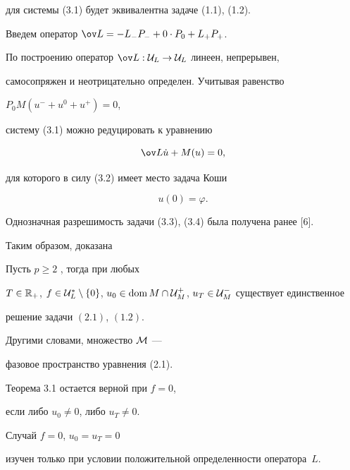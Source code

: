 для системы (3.1) будет эквивалентна задаче (1.1), (1.2).





Введем оператор $\ov L = -L_- P_- + 0\cdot P_0 + L_+ P_+$.


По построению оператор $\ov L : {\cal U}_L\to{\cal U}_L$ линеен, непрерывен,


самосопряжен и неотрицательно определен. Учитывая равенство


$P_0 M (u^- + u^0 + u^+) = 0$,


систему (3.1) можно редуцировать к уравнению


\begin{equation}


\ov L \dot u + M(u) = 0,


\end{equation}


для которого в силу (3.2) имеет место задача Коши


\begin{equation}


u(0) = \varphi.


\end{equation}


Однозначная разрешимость задачи (3.3), (3.4) была получена ранее [6].


Таким образом, доказана





\begin{thms}


Пусть $p\ge 2$ , тогда при любых


$T\in{\Bbb R}_+$, $f\in {\cal U}^*_L\setminus\{0\}$, $u_0\in\doms


M\cap {\cal U}^+_M$, $u_T\in{\cal U}^-_M$ существует единственное


решение задачи $(2.1)$, $(1.2)$.


\end{thms}





Другими словами, множество ${\cal M}$ ---


фазовое пространство уравнения (2.1).





\begin{notes}


Теорема 3.1 остается верной при $f {=} 0$,


если либо $u_0\neq 0$, либо $u_T\neq 0$.


Случай $f = 0$, $u_0 = u_T = 0$


изучен только при условии положительной определенности оператора~$L$.


\end{notes}





